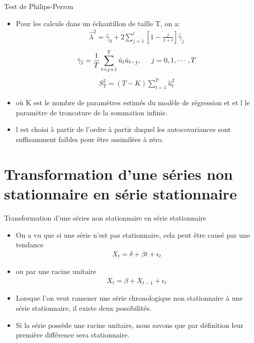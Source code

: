 \documentclass{beamer}
\begin{document}
\begin{frame}{Test de Philips-Perron}
\begin{itemize}
\item Pour les calculs dans un échantillon de taille T, on a:
\begin{align*}
\hat{\lambda}^2=\hat{\gamma}_0+2 \sum_{j=1}^{l} \left[1-\frac{j}{1+l} \right]\hat{\gamma}_j
\end{align*}
\begin{align*}
\hat{\gamma}_j=\frac{1}{T}\sum_{t=j+1}^T\hat{u}_t \hat{u}_{t-j}, \hspace{0.5cm} j=0,1,\cdots,T
\end{align*}
\begin{align*}
S_T^2=(T-K)\sum_{t=1}^T\hat{u}_t^2
\end{align*}
\item où K est le nombre de paramètres estimés du modèle de régression et et l le paramètre de troncature de la sommation infinie.
\item l est choisi à partir de l’ordre à partir duquel les autocovariances sont suffisamment faibles pour être assimilées à zéro.
\end{itemize}
\end{frame}


\section{Transformation d'une séries non stationnaire en série stationnaire}
\frame{\tableofcontents[current]}

\begin{frame}{Transformation d'une séries non stationnaire en série stationnaire}
\begin{itemize}
\item On a vu que si une série n’est pas stationnaire, cela peut être causé par une tendance 
\begin{align*}
X_t=\delta+\beta t+\epsilon_t
\end{align*}
\item ou par une racine unitaire 
\begin{align*}
X_t=\beta+ X_{t-1}+\epsilon_t
\end{align*}
\item Lorsque l’on veut ramener une série chronologique non stationnaire à une série stationnaire, il existe deux possibilités.
\item Si la série possède une racine unitaire, nous savons que par définition leur première différence sera stationnaire.
\end{itemize}
\end{frame}
\end{document}
